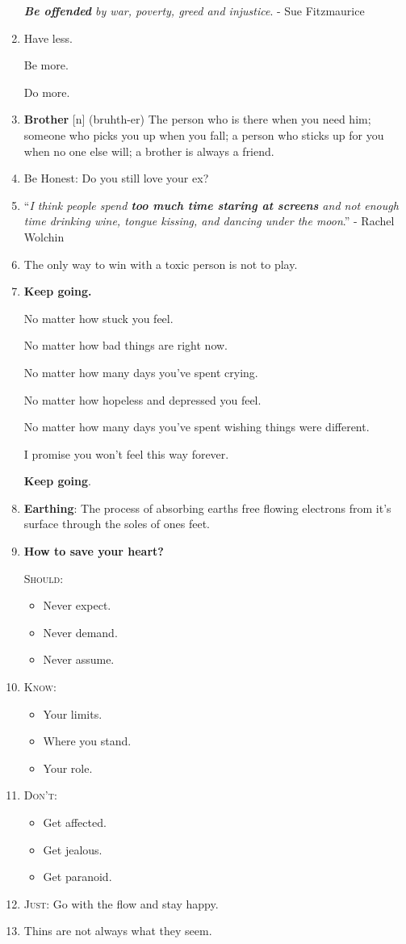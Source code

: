 \documentclass{article}
\begin{document}
\begin{enumerate}
	\textit{\textbf{Be offended} by war, poverty, greed and injustice}. - Sue Fitzmaurice
	\item Have less.
	
	Be more.
	
	Do more.
	\item \textbf{Brother} [n] (bruhth-er) The person who is there when you need him; someone who picks you up when you fall; a person who sticks up for you when no one else will; a brother is always a friend.
	\item Be Honest: Do you still love your ex?
	\item ``\textit{I think people spend \textbf{too much time staring at screens} and not enough time drinking wine, tongue kissing, and dancing under the moon}.'' - Rachel Wolchin
	\item The only way to win with a toxic person is not to play.
	\item \textbf{Keep going.}
	
	No matter how stuck you feel.
	
	No matter how bad things are right now.
	
	No matter how many days you've spent crying.
	
	No matter how hopeless and depressed you feel.
	
	No matter how many days you've spent wishing things were different.
	
	I promise you won't feel this way forever.
	
	\textbf{Keep going}.
	\item \textbf{Earthing}: The process of absorbing earths free flowing electrons from it's surface through the soles of ones feet.
	\item \textbf{How to save your heart?}
	
	\textsc{Should}:
	\begin{itemize}
		\item Never expect.
		\item Never demand.
		\item Never assume.
	\end{itemize}
	\item \textsc{Know}:
	\begin{itemize}
		\item Your limits.
		\item Where you stand.
		\item Your role.
	\end{itemize}
	\item \textsc{Don't}:
	\begin{itemize}
		\item Get affected.
		\item Get jealous.
		\item Get paranoid.
	\end{itemize}
	\item \textsc{Just}: Go with the flow and stay happy.
	\item Thins are not always what they seem.
	

\end{enumerate}
\end{document}
